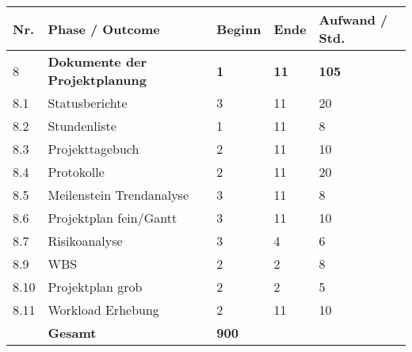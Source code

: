 \begin{tabular}{ | l | p{8cm} | l |l|l|}
\hline
\textbf{Nr.} & \textbf{Phase / Outcome} & \textbf{Beginn}& \textbf{Ende}& \textbf{Aufwand / Std.} \\
\hline
8 &\textbf{Dokumente der Projektplanung}     &\textbf{1} &\textbf{11} &\textbf{105}  \\
\hline
8.1 & Statusberichte                &3 &11 & 20 \\
\hline
8.2 &Stundenliste                      &1 &11 & 8 \\
\hline
8.3 &Projekttagebuch                   &2 &11 & 10 \\
\hline
8.4 &Protokolle                        &2 &11 & 20 \\
\hline
8.5 &Meilenstein Trendanalyse          &3 &11 & 8 \\
\hline
8.6 &Projektplan fein/Gantt            &3 &11 & 10 \\
\hline
8.7 &Risikoanalyse                     &3 &4 & 6 \\
\hline
8.9 &WBS                               &2 &2 & 8 \\
\hline
8.10 &Projektplan grob                 &2 &2 & 5 \\
\hline
8.11 &Workload Erhebung                &2 &11 & 10 \\
\hline
& \textbf{Gesamt} &\textbf{900} \\
\hline
\hline
\end{tabular}